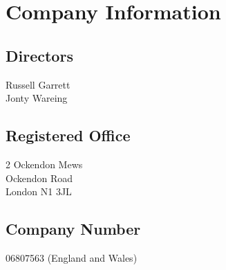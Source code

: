 \tableofcontents
\vfill
\section{Company Information}

\subsection{Directors}
Russell Garrett \\
Jonty Wareing 

\subsection{Registered Office}

2 Ockendon Mews \\
Ockendon Road \\
London N1 3JL

\subsection{Company Number}
06807563 (England and Wales)
